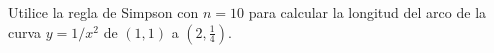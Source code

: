 \item Utilice la regla de Simpson con $n = 10$ para calcular la longitud del arco de la curva $y = 1/x^2$ de $(1, 1)$ a $\left(2, \frac{1}{4}\right)$.
